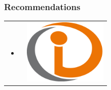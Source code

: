 \begin{frame}
\frametitle{Recommendations}
\begin{table}
\begin{tabular}{p{7cm}p{3cm}}
\begin{itemize}
    \item 





\end{itemize}
&
\vspace{1.5cm}
\includegraphics[width=4cm]{img/example}\\
\end{tabular}
\end{table}
\end{frame}
